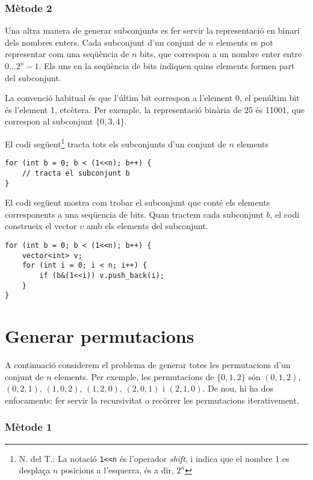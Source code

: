 \subsubsection{Mètode 2}

Una altra manera de generar subconjunts es fer servir
la representació en binari dels nombres enters.
Cada subconjunt d'un conjunt de $n$ elements
es pot representar com una seqüència de $n$ bits,
que correspon a un nombre enter entre $0 \ldots 2^n-1$.
Els uns en la seqüència de bits indiquen
quins elements formen part del subconjunt.

La convenció habitual és que
l'últim bit correspon a l'element 0,
el penúltim bit és l'element 1,
etcètera.
Per exemple, la representació binària de 25
és 11001, que correspon al subconjunt $\{0,3,4\}$.

El codi següent\footnote{N. del T.: La notació \texttt{1<<n} és l'operador \emph{shift}, i indica que el nombre 1 es desplaça $n$
posicions a l'esquerra, és a dir, $2^n$}
tracta tots els subconjunts d'un conjunt de $n$ elements

\begin{lstlisting}
for (int b = 0; b < (1<<n); b++) {
    // tracta el subconjunt b
}
\end{lstlisting}

El codi següent mostra com trobar el subconjunt que conté
els elements corresponents a una seqüencia de bits.
Quan tractem cada subconjunt $b$, el codi construeix el vector
$v$ amb els elements del subconjunt.

\begin{lstlisting}
for (int b = 0; b < (1<<n); b++) {
    vector<int> v;
    for (int i = 0; i < n; i++) {
        if (b&(1<<i)) v.push_back(i);
    }
}
\end{lstlisting}

\section{Generar permutacions}


A continuació considerem el problema de generar
totes les permutacions d'un conjunt de $n$ elements.
Per exemple, les permutacions de $\{0,1,2\}$ són
$(0,1,2)$, $(0,2,1)$, $(1,0,2)$, $(1,2,0)$,
$(2,0,1)$ i $(2,1,0)$.
De nou, hi ha dos enfocaments:
fer servir la recursivitat o recórrer les permutacions
iterativement.

\subsubsection{Mètode 1}

